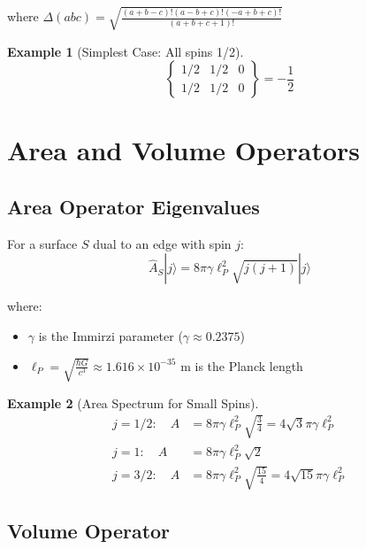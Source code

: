 \documentclass[12pt,a4paper]{article}
\theoremstyle{definition}
\newtheorem{example}{Example}[section]
\begin{document}
where $\Delta(abc) = \sqrt{\frac{(a+b-c)!(a-b+c)!(-a+b+c)!}{(a+b+c+1)!}}$

\begin{example}[Simplest Case: All spins 1/2]
\begin{equation}
\begin{Bmatrix} 1/2 & 1/2 & 0 \\ 1/2 & 1/2 & 0 \end{Bmatrix} = -\frac{1}{2}
\end{equation}
\end{example}

\section{Area and Volume Operators}

\subsection{Area Operator Eigenvalues}

For a surface $S$ dual to an edge with spin $j$:
\begin{equation}
\hat{A}_S |j\rangle = 8\pi\gamma\ell_P^2\sqrt{j(j+1)} |j\rangle
\end{equation}

where:
\begin{itemize}
    \item $\gamma$ is the Immirzi parameter ($\gamma \approx 0.2375$)
    \item $\ell_P = \sqrt{\frac{\hbar G}{c^3}} \approx 1.616 \times 10^{-35}$ m is the Planck length
\end{itemize}

\begin{example}[Area Spectrum for Small Spins]
\begin{align}
j = 1/2: \quad A &= 8\pi\gamma\ell_P^2\sqrt{\frac{3}{4}} = 4\sqrt{3}\pi\gamma\ell_P^2 \\
j = 1: \quad A &= 8\pi\gamma\ell_P^2\sqrt{2} \\
j = 3/2: \quad A &= 8\pi\gamma\ell_P^2\sqrt{\frac{15}{4}} = 4\sqrt{15}\pi\gamma\ell_P^2
\end{align}
\end{example}

\subsection{Volume Operator}
\end{document}
